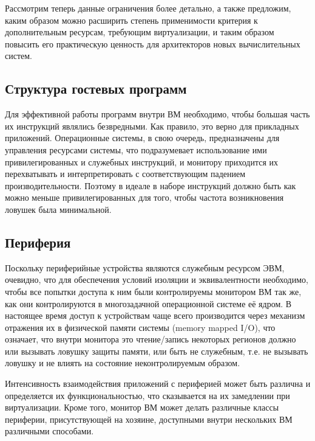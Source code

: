 Рассмотрим теперь данные ограничения более детально, а также предложим, каким образом можно расширить степень применимости критерия к дополнительным ресурсам, требующим виртуализации, и таким образом повысить его практическую ценность для архитекторов новых вычислительных систем.

\subsection{Структура гостевых программ}

Для эффективной работы программ внутри ВМ необходимо, чтобы большая часть их инструкций являлись безвредными. Как правило, это верно для прикладных приложений. Операционные системы, в свою очередь, предназначены для управления ресурсами системы, что подразумевает использование ими привилегированных и служебных инструкций, и монитору приходится их перехватывать и интерпретировать с соответствующим падением производительности. Поэтому в идеале в наборе инструкций должно быть как можно меньше привилегированных для того, чтобы частота возникновения ловушек была минимальной.

\subsection{Периферия}

Поскольку периферийные устройства являются служебным ресурсом ЭВМ, очевидно, что для обеспечения условий изоляции и эквивалентности необходимо, чтобы все попытки доступа к ним были контролируемы монитором ВМ так же, как они контролируются в многозадачной операционной системе её ядром. В настоящее время доступ к устройствам чаще всего производится через механизм отражения их в физической памяти системы (\abbr memory mapped I/O), что означает, что внутри монитора это чтение/запись некоторых регионов должно или вызывать ловушку защиты памяти, или быть не служебным, т.е. не вызывать ловушку и не влиять на состояние неконтролируемым образом.

Интенсивность взаимодействия приложений с периферией может быть различна и определяется их функциональностью, что сказывается на их замедлении при виртуализации. Кроме того, монитор ВМ может делать различные классы периферии, присутствующей на хозяине, доступными внутри нескольких ВМ различными способами.

